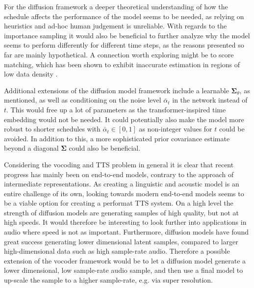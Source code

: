 \documentclass{report}
\begin{document}
For the diffusion framework a deeper theoretical understanding of how the schedule affects the performance of the model seems to be needed, as relying on heuristics and ad-hoc human judgement is unreliable. With regards to the importance sampling it would also be beneficial to further analyze why the model seems to perform differently for different time steps, as the reasons presented so far are mainly hypothetical. A connection worth exploring might be to score matching, which has been shown to exhibit inaccurate estimation in regions of low data density \cite{song2019generative}. 

Additional extensions of the diffusion model framework include a learnable $\bm{\Sigma}_{\theta}$, as mentioned, as well as conditioning on the noise level $\bar{\alpha}_t$ in the network instead of $t$. This would free up a lot of parameters as the transformer-inspired time embedding would not be needed. It could potentially also make the model more robust to shorter schedules with $\bar{\alpha}_t \in [0, 1]$ as non-integer values for $t$ could be avoided. In addition to this, a more sophisticated prior covariance estimate beyond a diagonal $\bm{\Sigma}$ could also be beneficial.

Considering the vocoding and TTS problem in general it is clear that recent progress has mainly been on end-to-end models, contrary to the approach of intermediate representations. As creating a linguistic and acoustic model is an entire challenge of its own, looking towards modern end-to-end models seems to be a viable option for creating a performat TTS system. On a high level the strength of diffusion models are generating samples of high quality, but not at high speeds. It would therefore be interesting to look further into applications in audio where speed is not as important. Furthermore, diffusion models have found great success generating lower dimensional latent samples, compared to larger high-dimensional data such as high sample-rate audio. Therefore a possible extension of the vocoder framework would be to let a diffusion model generate a lower dimensional, low sample-rate audio sample, and then use a final model to up-scale the sample to a higher sample-rate, e.g. via super resolution.

\newpage



\end{document}
